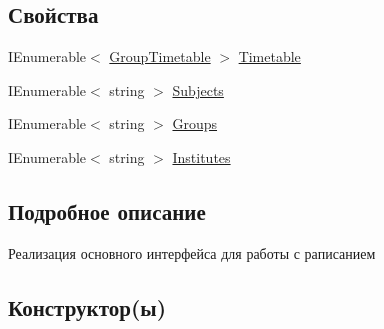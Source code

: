 \subsection*{Свойства}
\begin{DoxyCompactItemize}
\item 
I\+Enumerable$<$ \hyperlink{class_s_f_u_timetable_parser_1_1_core_1_1_entities_1_1_group_timetable}{Group\+Timetable} $>$ \hyperlink{class_s_f_u_timetable_parser_1_1_implementation_1_1_timetable_manager_a147d539c841ac942201c132013d0293f}{Timetable}
\item 
I\+Enumerable$<$ string $>$ \hyperlink{class_s_f_u_timetable_parser_1_1_implementation_1_1_timetable_manager_a7b8c8acd9e266e41f023ac57b6f88209}{Subjects}
\item 
I\+Enumerable$<$ string $>$ \hyperlink{class_s_f_u_timetable_parser_1_1_implementation_1_1_timetable_manager_a382d2dd82077238efd4dbc224e3ac44a}{Groups}
\item 
I\+Enumerable$<$ string $>$ \hyperlink{class_s_f_u_timetable_parser_1_1_implementation_1_1_timetable_manager_a15bc77e455cc8e9add14f7131887aa8e}{Institutes}
\end{DoxyCompactItemize}


\subsection{Подробное описание}
Реализация основного интерфейса для работы с раписанием 

\subsection{Конструктор(ы)}
\mbox{\label{class_s_f_u_timetable_parser_1_1_implementation_1_1_timetable_manager_adc6225553917e6907461c1e127084dcb}} 
